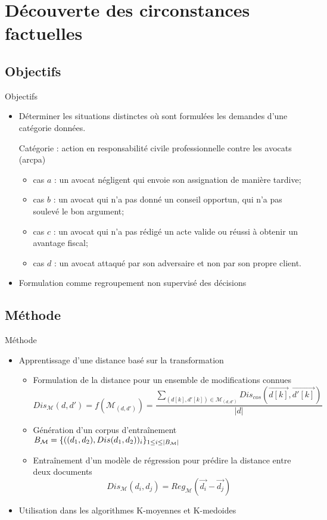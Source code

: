 \section{Découverte des circonstances factuelles}
\subsection{Objectifs}
\begin{frame}[c]{Objectifs}
	
	\begin{itemize} \scriptsize
		\item Déterminer les situations distinctes où sont formulées les demandes d'une catégorie données.
		\begin{exampleblock}{Catégorie : action en responsabilité civile professionnelle contre les avocats (arcpa)}
			\begin{itemize}
				\item cas $a$ : un avocat négligent qui envoie son assignation de manière tardive; 
				\item cas $b$ : un avocat qui n'a pas donné un conseil opportun, qui n'a pas soulevé le bon argument;
				\item cas $c$ : un avocat qui n'a pas rédigé un acte valide ou réussi à obtenir un avantage fiscal; 
				\item cas $d$ : un avocat attaqué par son adversaire et non par son propre client.
			\end{itemize}
		\end{exampleblock}
		\item Formulation comme regroupement non supervisé des décisions
	\end{itemize}
\end{frame}
\subsection{Méthode}
\begin{frame}[c]{Méthode}
	\begin{itemize}
		\item Apprentissage d'une distance basé sur la transformation
	\begin{itemize} 
		\item Formulation de la distance pour un ensemble de modifications connues	
		\[{Dis_\mathcal{M}}(d,d') = {f}(\mathcal{M}_{(d,d')}) = \frac{\sum\limits_{(d[k], d'[k]) \in \mathcal{M}_{(d,d')}} Dis_{cos}(\overrightarrow{d[k]}, \overrightarrow{d'[k]})}{\vert d \vert}\] 
		\item Génération d'un corpus d'entraînement	$B_\mathcal{M} = \lbrace ((d_1, d_2), {Dis}(d_1, d_2))_i\rbrace_{1 \leq i \leq {\vert B_\mathcal{M}\vert}}$
		\item Entraînement d'un modèle de régression pour prédire la distance entre deux documents \[Dis_\mathcal{M}(d_i, d_j) = Reg_\mathcal{M}(\vec{d_{i}} - \vec{d_{j}})\]
	\end{itemize}
	\item Utilisation dans les algorithmes K-moyennes et K-medoides				
	\end{itemize}	
\end{frame}

